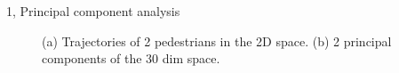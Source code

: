 \documentclass[10pt,a4paper]{article}
\begin{document}
\begin{task}{1, Principal component analysis}
\begin{figure}[H]
    \centering
    \hfill
    \caption{(a) Trajectories of 2 pedestrians in the 2D space.
    (b) 2 principal components of the 30 dim space.}
    \label{fig:trajs}
\end{figure}

\end{task}
\end{document}
